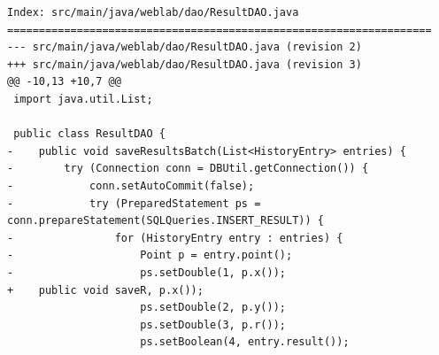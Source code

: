 \begin{lstlisting}[caption={Содержимое файла \texttt{breaking\_changes.log}},language={},captionpos=b]
Index: src/main/java/weblab/dao/ResultDAO.java
===================================================================
--- src/main/java/weblab/dao/ResultDAO.java	(revision 2)
+++ src/main/java/weblab/dao/ResultDAO.java	(revision 3)
@@ -10,13 +10,7 @@
 import java.util.List;
 
 public class ResultDAO {
-    public void saveResultsBatch(List<HistoryEntry> entries) {
-        try (Connection conn = DBUtil.getConnection()) {
-            conn.setAutoCommit(false);
-            try (PreparedStatement ps = conn.prepareStatement(SQLQueries.INSERT_RESULT)) {
-                for (HistoryEntry entry : entries) {
-                    Point p = entry.point();
-                    ps.setDouble(1, p.x());
+    public void saveR, p.x());
                     ps.setDouble(2, p.y());
                     ps.setDouble(3, p.r());
                     ps.setBoolean(4, entry.result());
\end{lstlisting}